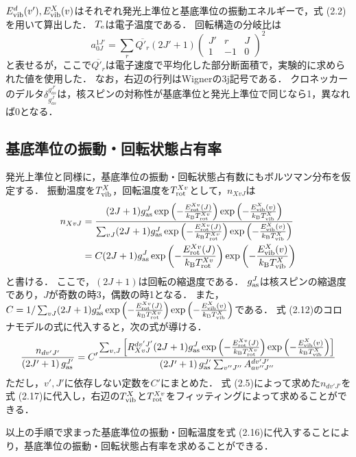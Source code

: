 $E^d_{\rm vib} (v'), E^X_{\rm vib} (v)$はそれぞれ発光上準位と基底準位の振動エネルギーで，式 (2.2)を用いて算出した．
$T_{\rm e}$は電子温度である．
回転構造の分岐比は
\begin{equation}
    a^{1J'}_{0J} = \sum_r \overline{Q'_{r}} (2J'+1) \left( \begin{array}{ccc} J' & r & J \\ 1 & -1 & 0 \end{array} \right)^2
\end{equation}
と表せる\cite{kyokaisou}が，ここで$\overline{Q'_{r}}$は電子速度で平均化した部分断面積で，実験的に求められた値\cite{senkusya}を使用した．
なお，右辺の行列はWignerの3j記号である．
クロネッカーのデルタ$\delta^{g^{J'}_{as}}_{g^J_{as}}$は，核スピンの対称性が基底準位と発光上準位で同じなら1，異なれば0となる．

\subsection{基底準位の振動・回転状態占有率}
発光上準位と同様に，基底準位の振動・回転状態占有数にもボルツマン分布を仮定する．
振動温度を$T^X_{\rm vib}$，回転温度を$T^{Xv}_{\rm rot}$として，$n_{XvJ}$は
\begin{equation}
\begin{split}
    n_{XvJ} &= \frac{ (2J+1) g^J_{\rm as} \exp \left( - \frac{E^{Xv}_{\rm rot}(J)}{k_{\rm B} T^{Xv}_{\rm rot}} \right) \exp \left( - \frac{E^{X}_{\rm vib}(v)}{k_{\rm B} T^{X}_{\rm vib}} \right) }{\sum_{vJ} (2J+1) g^J_{\rm as} \exp \left( - \frac{E^{Xv}_{\rm rot}(J)}{k_{\rm B} T^{Xv}_{\rm rot}} \right) \exp \left( - \frac{E^{X}_{\rm vib}(v)}{k_{\rm B} T^{X}_{\rm vib}} \right)}\\
    &= C (2J+1) g^J_{\rm as} \exp \left( - \frac{E^{Xv}_{\rm rot}(J)}{k_{\rm B} T^{Xv}_{\rm rot}} \right) \exp \left( - \frac{E^{X}_{\rm vib}(v)}{k_{\rm B} T^{X}_{\rm vib}} \right)
\end{split}
\end{equation}
と書ける．
ここで，$(2J+1)$は回転の縮退度である．
$g^J_{\rm as}$は核スピンの縮退度であり，$J$が奇数の時3，偶数の時1となる．
また，$C = 1 / \sum_{vJ} (2J+1) g^J_{\rm as} \exp \left( - \frac{E^{Xv}_{\rm rot}(J)}{k_{\rm B} T^{Xv}_{\rm rot}} \right) \exp \left( - \frac{E^{X}_{\rm vib}(v)}{k_{\rm B} T^{X}_{\rm vib}} \right)$である．
式 (2.12)のコロナモデルの式に代入すると，次の式が導ける．
\begin{equation}
    \frac{n_{dv'J'}}{\left( 2J'+1 \right) g^{J'}_{\rm as}} = C' \frac{ \sum_{v, J} \left[ R^{dv'J'}_{XvJ} (2J+1) g^J_{\rm as} \exp \left( - \frac{E^{Xv}_{\rm rot}(J)}{k_{\rm B} T^{Xv}_{\rm rot}} \right) \exp \left( - \frac{E^{X}_{\rm vib}(v)}{k_{\rm B} T^{X}_{\rm vib}} \right) \right] } {\left( 2J'+1 \right) g^{J'}_{\rm as} \sum_{v''J''} A^{dv'J'}_{av''J''} }
\end{equation}
ただし，$v', J'$に依存しない定数を$C'$にまとめた．
式 (2.5)によって求めた$n_{dv'J'}$を式 (2.17)に代入し，右辺の$T^{X}_{\rm vib}$と$T^{Xv}_{\rm rot}$をフィッティングによって求めることができる．

以上の手順で求まった基底準位の振動・回転温度を式 (2.16)に代入することにより，基底準位の振動・回転状態占有率を求めることができる．